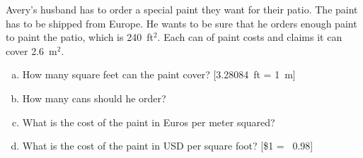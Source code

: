 \documentclass[11pt,letterpaper]{article}
\begin{document}
\newpage



 Avery's husband has to order a special paint they want for their patio. The paint has to be shipped from Europe. He wants to be sure that he orders enough paint to paint the patio, which is 240~ft$^2$. Each can of paint costs  and claims it can cover 2.6~m$^2$.
	\begin{enumerate}[(a)]
	\item How many square feet can the paint cover? [3.28084~ft = 1~m]
	\item How many cans should he order?
	\item What is the cost of the paint in Euros per meter squared?
	\item What is the cost of the paint in USD per square foot? [\$1 = \texteuro\ 0.98]
	\end{enumerate} \pspace
\end{document}
